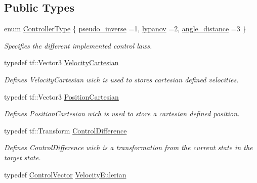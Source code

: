 \subsection*{Public Types}
\begin{DoxyCompactItemize}
\item 
enum \hyperlink{classController_aa6d956c4c220461a4152415ffa78690a}{Controller\+Type} \{ \hyperlink{classController_aa6d956c4c220461a4152415ffa78690aad2e9073ef821965020410686a3c89483}{pseudo\+\_\+inverse} =1, 
\hyperlink{classController_aa6d956c4c220461a4152415ffa78690aaed0e850e561d54619d85f32c37f5bfab}{lypanov} =2, 
\hyperlink{classController_aa6d956c4c220461a4152415ffa78690aa7ab0ee34114a951d4491d6eb73500cdc}{angle\+\_\+distance} =3
 \}\begin{DoxyCompactList}\small\item\em Specifies the different implemented control laws. \end{DoxyCompactList}
\item 
typedef tf\+::\+Vector3 \hyperlink{classController_a7ab3d947ee649f6bac652de6a00e8148}{Velocity\+Cartesian}\hypertarget{classController_a7ab3d947ee649f6bac652de6a00e8148}{}\label{classController_a7ab3d947ee649f6bac652de6a00e8148}

\begin{DoxyCompactList}\small\item\em Defines Velocity\+Cartesian wich is used to stores cartesian defined velocities. \end{DoxyCompactList}\item 
typedef tf\+::\+Vector3 \hyperlink{classController_a1b8b4035525237f0112b81d44a23da2c}{Position\+Cartesian}\hypertarget{classController_a1b8b4035525237f0112b81d44a23da2c}{}\label{classController_a1b8b4035525237f0112b81d44a23da2c}

\begin{DoxyCompactList}\small\item\em Defines Position\+Cartesian wich is used to store a cartesian defined position. \end{DoxyCompactList}\item 
typedef tf\+::\+Transform \hyperlink{classController_a75a1e2f93842f65d1263f7d3c2fd8898}{Control\+Difference}\hypertarget{classController_a75a1e2f93842f65d1263f7d3c2fd8898}{}\label{classController_a75a1e2f93842f65d1263f7d3c2fd8898}

\begin{DoxyCompactList}\small\item\em Defines Control\+Difference wich is a transformation from the current state in the target state. \end{DoxyCompactList}\item 
typedef \hyperlink{structController_1_1ControlVector}{Control\+Vector} \hyperlink{classController_a6849bee332c04d67ac6f3052cccd2669}{Velocity\+Eulerian}\hypertarget{classController_a6849bee332c04d67ac6f3052cccd2669}{}\label{classController_a6849bee332c04d67ac6f3052cccd2669}


\end{DoxyCompactItemize}
